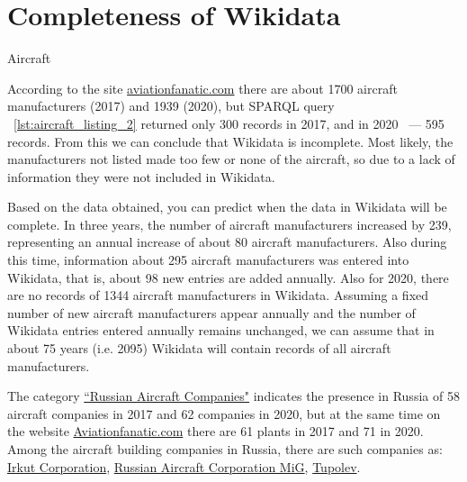 
\section{Completeness of Wikidata}


\label{question:aircraft_question_5}


\begin{marginfigure}
{
\setlength{\fboxsep}{0pt}%
\setlength{\fboxrule}{1pt}%
%
}
  \caption{Aircraft}%
  \label{fig:airship_question_aircraft_en}%
\end{marginfigure}





According to the site \href{https://www.aviationfanatic.com/}{aviationfanatic.com} there are about \num{1700} aircraft manufacturers (2017) 
and \num{1939} (2020), but SPARQL query ~\ref{lst:aircraft_listing_2} returned only 300 records in 2017, and in 2020 ~--- 595 records. 
From this we can conclude that Wikidata is incomplete. Most likely, the manufacturers not listed made too few or none of the aircraft, 
so due to a lack of information they were not included in Wikidata.

Based on the data obtained, you can predict when the data in Wikidata will be complete. In three years, the number of aircraft manufacturers 
increased by 239, representing an annual increase of about 80 aircraft manufacturers. Also during this time, information about 295 aircraft 
manufacturers was entered into Wikidata, that is, about 98 new entries are added annually. Also for 2020, there are no records of \num{1344} 
aircraft manufacturers in Wikidata. Assuming a fixed number of new aircraft manufacturers appear annually and the number of Wikidata entries 
entered annually remains unchanged, we can assume that in about 75 years (i.e. 2095) Wikidata will contain records of all aircraft manufacturers.

The category \href{https://cutt.ly/NhrKnWn}{``Russian Aircraft Companies"} indicates the presence in Russia of 58 aircraft companies in 2017 and 
62 companies in 2020, but at the same time on the website \href{https://www.aviationfanatic.com/}{Aviationfanatic.com} there are 61 
plants in 2017 and 71 in 2020. Among the aircraft building companies in Russia, there are such companies as: \href{https://en.wikipedia.org/wiki/Irkut_Corporation}{Irkut Corporation}, 
\href{https://en.wikipedia.org/wiki/Russian_Aircraft_Corporation_MiG}{Russian Aircraft Corporation MiG}, 
\href{https://en.wikipedia.org/wiki/Tupolev}{Tupolev}.

